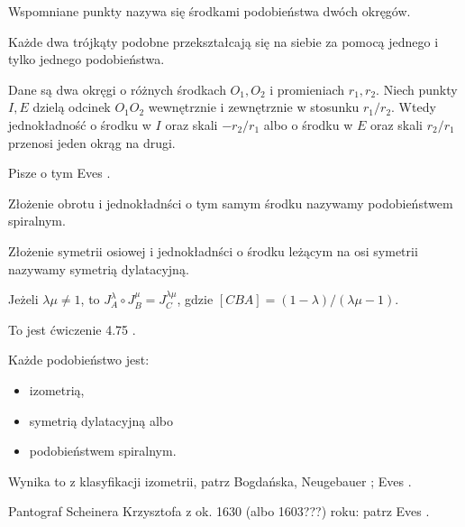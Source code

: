 Wspomniane punkty nazywa się środkami podobieństwa dwóch okręgów.

\begin{proposition}
    Każde dwa trójkąty podobne przekształcają się na siebie za pomocą jednego i tylko jednego podobieństwa.
\end{proposition}

\begin{proposition}
    Dane są dwa okręgi o różnych środkach $O_1, O_2$ i promieniach $r_1, r_2$.
    Niech punkty $I, E$ dzielą odcinek $O_1O_2$ wewnętrznie i zewnętrznie w stosunku $r_1/r_2$.
    Wtedy jednokładność o środku w $I$ oraz skali $-r_2/r_1$ albo o środku w $E$ oraz skali $r_2/r_1$ przenosi jeden okrąg na drugi.
\end{proposition}

Pisze o tym Eves \cite[s. 108]{eves1_1972}.

\begin{definition}
    Złożenie obrotu i jednokładnści o tym samym środku nazywamy podobieństwem spiralnym.
\end{definition}

\begin{definition}
    Złożenie symetrii osiowej i jednokładnści o środku leżącym na osi symetrii nazywamy symetrią dylatacyjną.
\end{definition}

\begin{proposition}
    Jeżeli $\lambda \mu \neq 1$, to $J_A^\lambda \circ J_B^\mu = J_C^{\lambda \mu}$, gdzie $[CBA] = (1-\lambda) / (\lambda \mu - 1)$.
\end{proposition}

To jest ćwiczenie 4.75 \cite[s. 217]{neugebauer_2018}.

\begin{proposition}
\label{podobienstwa_klasyfikacja}%
    Każde podobieństwo jest:
    \begin{itemize}
        \item izometrią,
        \item symetrią dylatacyjną albo
        \item podobieństwem spiralnym.
    \end{itemize}
\end{proposition}

Wynika to z klasyfikacji izometrii, patrz Bogdańska, Neugebauer \cite[s. 220]{neugebauer_2018}; Eves \cite[s. 118]{eves1_1972}.

Pantograf Scheinera Krzysztofa z ok. 1630 (albo 1603???) roku: patrz Eves \cite[s. 107]{eves1_1972}.
